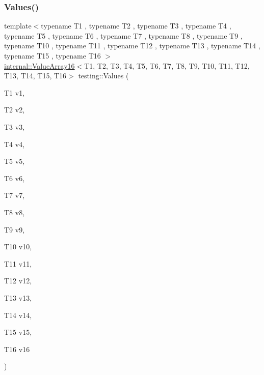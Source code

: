 \subsubsection{\texorpdfstring{Values()}{Values()}\hspace{0.1cm}{\footnotesize\ttfamily [17/51]}}
{\footnotesize\ttfamily template$<$typename T1 , typename T2 , typename T3 , typename T4 , typename T5 , typename T6 , typename T7 , typename T8 , typename T9 , typename T10 , typename T11 , typename T12 , typename T13 , typename T14 , typename T15 , typename T16 $>$ \\
\mbox{\hyperlink{classtesting_1_1internal_1_1_value_array16}{internal\+::\+Value\+Array16}}$<$T1, T2, T3, T4, T5, T6, T7, T8, T9, T10, T11, T12, T13, T14, T15, T16$>$ testing\+::\+Values (\begin{DoxyParamCaption}\item[{T1}]{v1,  }\item[{T2}]{v2,  }\item[{T3}]{v3,  }\item[{T4}]{v4,  }\item[{T5}]{v5,  }\item[{T6}]{v6,  }\item[{T7}]{v7,  }\item[{T8}]{v8,  }\item[{T9}]{v9,  }\item[{T10}]{v10,  }\item[{T11}]{v11,  }\item[{T12}]{v12,  }\item[{T13}]{v13,  }\item[{T14}]{v14,  }\item[{T15}]{v15,  }\item[{T16}]{v16 }\end{DoxyParamCaption})}

\mbox{\label{namespacetesting_a5cb89ee5c491cbe65de523f9f1bc1987}} 
